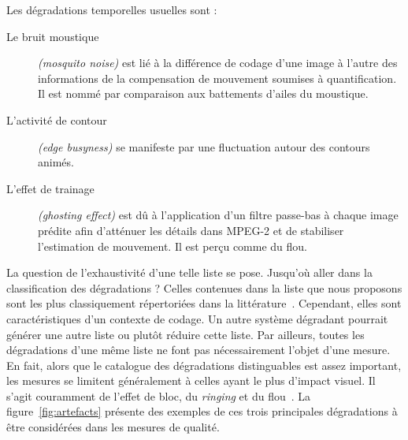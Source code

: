 Les dégradations temporelles usuelles sont :
\begin{description} %
\item[Le bruit moustique] \emph{(mosquito noise)} est lié à la différence de codage d'une image à l'autre des informations de la compensation de mouvement soumises à quantification. Il est nommé par comparaison aux battements d'ailes du moustique.
\item[L'activité de contour] \emph{(edge busyness)} se manifeste par une fluctuation autour des contours animés.
\item[L'effet de trainage] \emph{(ghosting effect)} est dû à l'application d'un filtre passe-bas à chaque image prédite afin d'atténuer les détails dans MPEG-2 et de stabiliser l'estimation de mouvement. Il est perçu comme du flou.
\end{description}

La question de l'exhaustivité d'une telle liste se pose. Jusqu'où aller dans la classification des dégradations ? Celles contenues dans la liste que nous proposons sont les plus classiquement répertoriées dans la littérature~\cite{yuen-sp1998, bretillon-phd}. Cependant, elles sont caractéristiques d'un contexte de codage. Un autre système dégradant pourrait générer une autre liste ou plutôt réduire cette liste. Par ailleurs, toutes les dégradations d'une même liste ne font pas nécessairement l'objet d'une mesure. En fait, alors que le catalogue des dégradations distinguables est assez important, les mesures se limitent généralement à celles ayant le plus d'impact visuel. Il s'agit couramment de l'effet de bloc, du \emph{ringing} et du flou~\cite{farias-phd, crete-phd}. La figure~\ref{fig:artefacts} présente des exemples de ces trois principales dégradations à être considérées dans les mesures de qualité.

